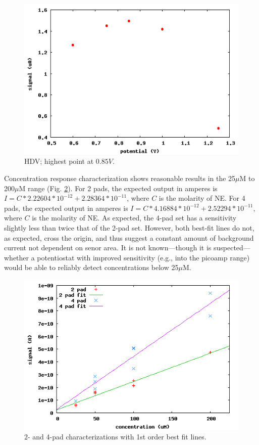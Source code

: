 \documentclass{article}
\begin{document}
\begin{figure}
\centering
\includegraphics[width=\linewidth]{figures/hdv.png}
\caption{HDV; highest point at $0.85V$.}
\label{hdv}
\end{figure}

Concentration response characterization shows reasonable results in the 25$\mu$M to 200$\mu$M range (Fig. \ref{char}). For 2 pads, the expected output in amperes is $I = C * 2.22604*10^{-12} + 2.28364*10^{-11}$, where $C$ is the molarity of NE. For 4 pads, the expected output in amperes is $I = C * 4.16884*10^{-12} + 2.52294*10^{-11}$, where $C$ is the molarity of NE. As expected, the 4-pad set has a sensitivity slightly less than twice that of the 2-pad set. However, both best-fit lines do not, as expected, cross the origin, and thus suggest a constant amount of background current not dependent on senor area. It is not known---though it is suspected---whether a potentiostat with improved sensitivity (e.g., into the picoamp range) would be able to reliably detect concentrations below 25$\mu$M.

\begin{figure}
\centering
\includegraphics[width=\linewidth]{figures/char.png}
\caption{2- and 4-pad characterizations with 1st order best fit lines.}
\label{char}
\end{figure}
\end{document}
